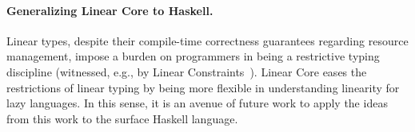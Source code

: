 \documentclass[acmsmall,review,anonymous,screen]{acmart}
\begin{document}
\paragraph{Generalizing Linear Core to Haskell.}
Linear types, despite their compile-time correctness guarantees regarding
resource management, impose a burden on programmers in being a restrictive
typing discipline (witnessed, e.g., by Linear
Constraints~\cite{cite:linearconstraints}). Linear Core eases the restrictions
of linear typing by being more flexible in understanding linearity for lazy
languages. In this sense, it is an avenue of future
work to apply the ideas from this work to the surface Haskell language.

% 
% 
% 
% 
% 
% 
% 
% 
% 
\end{document}
